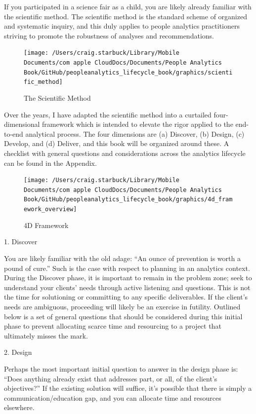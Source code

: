 \documentclass[]{book}
\begin{document}
If you participated in a science fair as a child, you are likely already familiar with the scientific method. The scientific method is the standard scheme of organized and systematic inquiry, and this duly applies to people analytics practitioners striving to promote the robustness of analyses and recommendations.

\begin{figure}
\texttt{[image: /Users/craig.starbuck/Library/Mobile Documents/com~apple~CloudDocs/Documents/People Analytics Book/GitHub/peopleanalytics\_lifecycle\_book/graphics/scientific\_method]} \caption{The Scientific Method}\label{fig:unnamed-chunk-2}
\end{figure}

Over the years, I have adapted the scientific method into a curtailed four-dimensional framework which is intended to elevate the rigor applied to the end-to-end analytical process. The four dimensions are (a) Discover, (b) Design, (c) Develop, and (d) Deliver, and this book will be organized around these. A checklist with general questions and considerations across the analytics lifecycle can be found in the Appendix.

\begin{figure}
\texttt{[image: /Users/craig.starbuck/Library/Mobile Documents/com~apple~CloudDocs/Documents/People Analytics Book/GitHub/peopleanalytics\_lifecycle\_book/graphics/4d\_framework\_overview]} \caption{4D Framework}\label{fig:unnamed-chunk-3}
\end{figure}

1. Discover

You are likely familiar with the old adage: ``An ounce of prevention is worth a pound of cure.'' Such is the case with respect to planning in an analytics context. During the Discover phase, it is important to remain in the problem zone; seek to understand your clients' needs through active listening and questions. This is not the time for solutioning or committing to any specific deliverables. If the client's needs are ambiguous, proceeding will likely be an exercise in futility. Outlined below is a set of general questions that should be considered during this initial phase to prevent allocating scarce time and resourcing to a project that ultimately misses the mark.

2. Design

Perhaps the most important initial question to answer in the design phase is: ``Does anything already exist that addresses part, or all, of the client's objectives?'' If the existing solution will suffice, it's possible that there is simply a communication/education gap, and you can allocate time and resources elsewhere.
\end{document}

